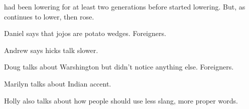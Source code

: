 \bat had been lowering for at least two generations before \ban started lowering. But, as \bat continues to lower, \ban then rose.







Daniel says that jojos are potato wedges. Foreigners.

Andrew says hicks talk slower.

Doug talks about Warshington but didn't notice anything else. Foreigners.

Marilyn talks about Indian accent.

Holly also talks about how people should use less slang, more proper words.






    
    









